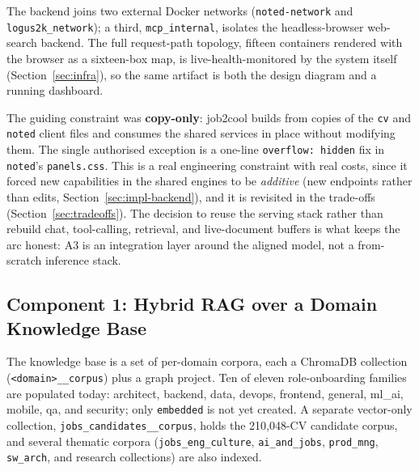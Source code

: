 The backend joins two external Docker networks (\verb|noted-network| and
\verb|logus2k_network|); a third, \verb|mcp_internal|, isolates the headless-browser
web-search backend. The full request-path topology, fifteen containers rendered with the
browser as a sixteen-box map, is live-health-monitored by the system itself
(Section~\ref{sec:infra}), so the same artifact is both the design diagram and a running
dashboard.

The guiding constraint was \textbf{copy-only}: job2cool builds from copies of the
\verb|cv| and \verb|noted| client files and consumes the shared services in place without
modifying them. The single authorised exception is a one-line \verb|overflow: hidden| fix
in \verb|noted|'s \verb|panels.css|. This is a real engineering constraint with real
costs, since it forced new capabilities in the shared engines to be \emph{additive} (new
endpoints rather than edits, Section~\ref{sec:impl-backend}), and it is revisited in the
trade-offs (Section~\ref{sec:tradeoffs}). The decision to reuse the serving stack rather
than rebuild chat, tool-calling, retrieval, and live-document buffers is what keeps the
arc honest: A3 is an integration layer around the aligned model, not a from-scratch
inference stack.

\subsection{Component 1: Hybrid RAG over a Domain Knowledge Base}
\label{sec:rag}

The knowledge base is a set of per-domain corpora, each a ChromaDB collection
(\verb|<domain>__corpus|) plus a graph project. Ten of eleven role-onboarding families are
populated today: architect, backend, data, devops, frontend, general, ml\_ai, mobile, qa,
and security; only \texttt{embedded} is not yet created. A separate vector-only
collection, \verb|jobs_candidates__corpus|, holds the 210,048-CV candidate corpus, and
several thematic corpora (\verb|jobs_eng_culture|, \verb|ai_and_jobs|, \verb|prod_mng|,
\verb|sw_arch|, and research collections) are also indexed.


